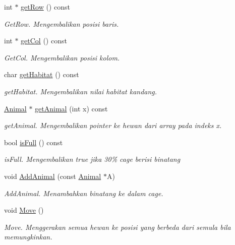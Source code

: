 \begin{DoxyCompactItemize}
int $\ast$ \hyperlink{classCage_a772fc432329f4f31dec41e6b7420b738}{get\+Row} () const 
\begin{DoxyCompactList}\small\item\em Get\+Row. Mengembalikan posisi baris. \end{DoxyCompactList}\item 
int $\ast$ \hyperlink{classCage_a89adfc6b5d08120c6be34753cc340666}{get\+Col} () const 
\begin{DoxyCompactList}\small\item\em Get\+Col. Mengembalikan posisi kolom. \end{DoxyCompactList}\item 
char \hyperlink{classCage_a9840593873ce0d8e5da91045883f4bfc}{get\+Habitat} () const 
\begin{DoxyCompactList}\small\item\em get\+Habitat. Mengembalikan nilai habitat kandang. \end{DoxyCompactList}\item 
\hyperlink{classAnimal}{Animal} $\ast$ \hyperlink{classCage_a4671c9ad04e70ca66517fde53267954f}{get\+Animal} (int x) const 
\begin{DoxyCompactList}\small\item\em get\+Animal. Mengembalikan pointer ke hewan dari array pada indeks x. \end{DoxyCompactList}\item 
bool \hyperlink{classCage_a6e4f2417918ef61eee36cdf27a807a8d}{is\+Full} () const 
\begin{DoxyCompactList}\small\item\em is\+Full. Mengembalikan true jika 30\% cage berisi binatang \end{DoxyCompactList}\item 
void \hyperlink{classCage_a2123b8cbc7177526b9da8a098bc19afd}{Add\+Animal} (const \hyperlink{classAnimal}{Animal} $\ast$A)
\begin{DoxyCompactList}\small\item\em Add\+Animal. Menambahkan binatang ke dalam cage. \end{DoxyCompactList}\item 
void \hyperlink{classCage_a449f19d08289f70a140955a99769ae4a}{Move} ()
\begin{DoxyCompactList}\small\item\em Move. Menggerakan semua hewan ke posisi yang berbeda dari semula bila memungkinkan. \end{DoxyCompactList}\item 

\end{DoxyCompactItemize}
